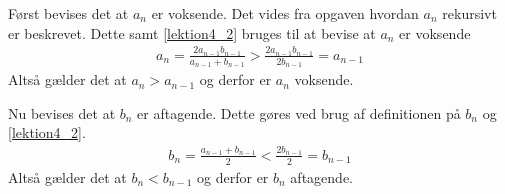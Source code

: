 \begin{bev} \textbf{} %
\newline
Først bevises det at $a_n$ er voksende. Det vides fra opgaven hvordan $a_n$ rekursivt er beskrevet. Dette samt \eqref{lektion4_2} bruges til at bevise at $a_n$ er voksende
\begin{align*}
    a_n = \frac{2a_{n-1}b_{n-1}}{a_{n-1}+b_{n-1}}>\frac{2a_{n-1}b_{n-1}}{2b_{n-1}} = a_{n-1}
\end{align*}
Altså gælder det at $a_n > a_{n-1}$ og derfor er $a_n$ voksende.

Nu bevises det at $b_n$ er aftagende. Dette gøres ved brug af definitionen på $b_n$ og \eqref{lektion4_2}. 
\begin{align*}
    b_n = \frac{a_{n-1}+b_{n-1}}{2} < \frac{2b_{n-1}}{2} = b_{n-1}
\end{align*}
Altså gælder det at $b_n < b_{n-1}$ og derfor er $b_n$ aftagende.
\end{bev}